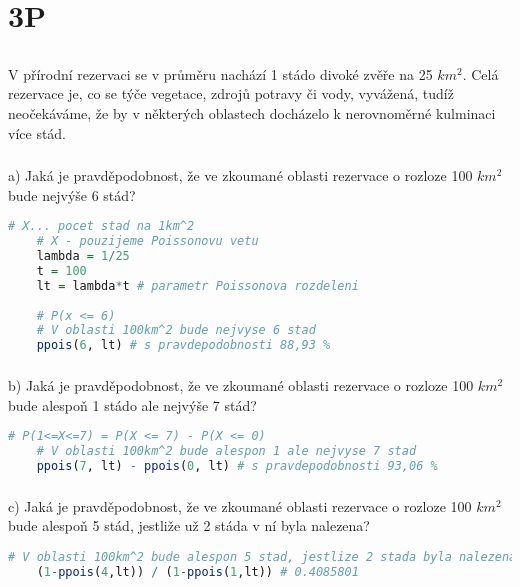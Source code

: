 \documentclass{article}%
\begin{document}
\newpage
\section{3P}

\subsection{}
V přírodní rezervaci se v průměru nachází 1 stádo divoké zvěře na 25 $km^2$. Celá rezervace je, co se týče vegetace, zdrojů potravy či vody, vyvážená, tudíž neočekáváme, že by v některých oblastech docházelo k nerovnoměrné kulminaci více stád.

\subsubsection{}
a) Jaká je pravděpodobnost, že ve zkoumané oblasti rezervace o rozloze 100 $km^2$ bude nejvýše 6 stád?

\begin{lstlisting}[language=R, showstringspaces=false, basicstyle=\small]
    # X... pocet stad na 1km^2
    # X - pouzijeme Poissonovu vetu
    lambda = 1/25
    t = 100
    lt = lambda*t # parametr Poissonova rozdeleni
    
    # P(x <= 6)
    # V oblasti 100km^2 bude nejvyse 6 stad
    ppois(6, lt) # s pravdepodobnosti 88,93 %    
\end{lstlisting}

\subsubsection{}
b) Jaká je pravděpodobnost, že ve zkoumané oblasti rezervace o rozloze 100 $km^2$ bude alespoň 1 stádo ale nejvýše 7 stád? 

\begin{lstlisting}[language=R, showstringspaces=false, basicstyle=\small]
    # P(1<=X<=7) = P(X <= 7) - P(X <= 0)
    # V oblasti 100km^2 bude alespon 1 ale nejvyse 7 stad
    ppois(7, lt) - ppois(0, lt) # s pravdepodobnosti 93,06 %
\end{lstlisting}

\subsubsection{}
c) Jaká je pravděpodobnost, že ve zkoumané oblasti rezervace o rozloze 100 $km^2$ bude alespoň 5 stád, jestliže už 2 stáda v ní byla nalezena?

\begin{lstlisting}[language=R, showstringspaces=false, basicstyle=\small]
    # V oblasti 100km^2 bude alespon 5 stad, jestlize 2 stada byla nalezena
    (1-ppois(4,lt)) / (1-ppois(1,lt)) # 0.4085801
\end{lstlisting}
\end{document}

